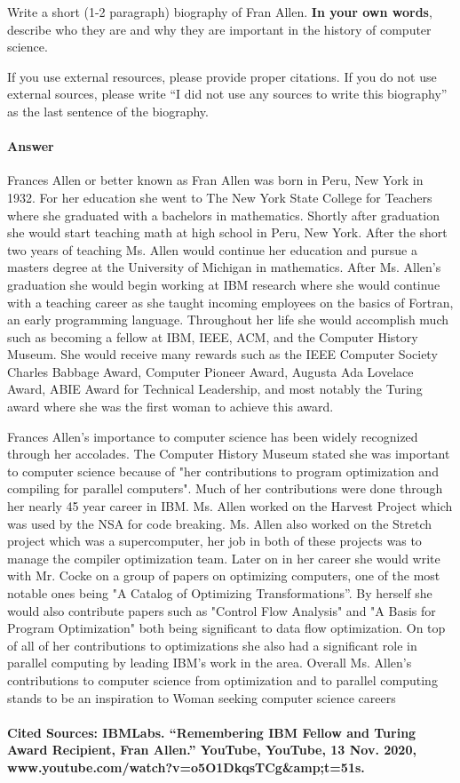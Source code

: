\documentclass{article}
\begin{document}
Write a short (1-2 paragraph) biography of Fran Allen.
\textbf{In your own words}, describe who they are and why they are important in
the history of computer science.

If you use external resources, please provide
proper citations. If you do not use external sources, please write ``I did not
use any sources to write this biography'' as the last sentence of the
biography.


\paragraph{Answer}

{Frances Allen or better known as Fran Allen was born in Peru, New York in 1932. For her education she went to The New York State College for Teachers where she graduated with a bachelors in mathematics. Shortly after graduation she would start teaching math at high school in Peru, New York. After the short two years of teaching Ms. Allen would continue her education and pursue a masters degree at the University of Michigan in mathematics. After Ms. Allen's graduation she would begin working at IBM research where she would continue with a teaching career as she taught incoming employees on the basics of Fortran, an early programming language. Throughout her life she would accomplish much such as becoming a fellow at IBM, IEEE, ACM, and the Computer History Museum. She would receive many rewards such as the IEEE Computer Society Charles Babbage Award, Computer Pioneer Award, Augusta Ada Lovelace Award, ABIE Award for Technical Leadership, and most notably the Turing award where she was the first woman to achieve this award.

Frances Allen's importance to computer science has been widely recognized through her accolades. The Computer History Museum stated she was important to computer science because of "her contributions to program optimization and compiling for parallel computers". Much of her contributions were done through her nearly 45 year career in IBM. Ms. Allen worked on the Harvest Project which was used by the NSA for code breaking. Ms. Allen also worked on the Stretch project which was a supercomputer, her job in both of these projects was to manage the compiler optimization team. Later on in her career she would write with Mr. Cocke on a group of papers on optimizing computers, one of the most notable ones being "A Catalog of Optimizing Transformations''. By herself she would also contribute papers such as "Control Flow Analysis" and "A Basis for Program Optimization" both being significant to data flow optimization. On top of all of her contributions to optimizations she also had a significant role in parallel computing by leading IBM's work in the area. Overall Ms. Allen's contributions to computer science from optimization and to parallel computing stands to be an inspiration to Woman seeking computer science careers
}


\newpage



\paragraph{Cited Sources: IBMLabs. “Remembering IBM Fellow and Turing Award Recipient, Fran Allen.” YouTube, YouTube, 13 Nov. 2020, www.youtube.com/watch?v=o5O1DkqsTCg&amp;t=51s.}
\end{document}
